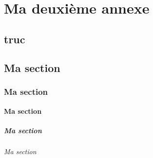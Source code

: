 \documentclass[bare]{polytech/polytech}
\begin{document}
\label{ann:chap1:sec}

\chapter{Ma deuxième annexe}
  
\label{ann:chap2}
     
\lipsum[1-4]

\section{truc}

\label{ann:chap2:sec}

\section{Ma section}

\lipsum[1-3]

\subsection{Ma section}

\lipsum[1-3]

\subsubsection{Ma section}

\lipsum[1-3]

\paragraph{Ma section}

\lipsum[1-3]

\subparagraph{Ma section}

\lipsum[1-3]
\end{document}
